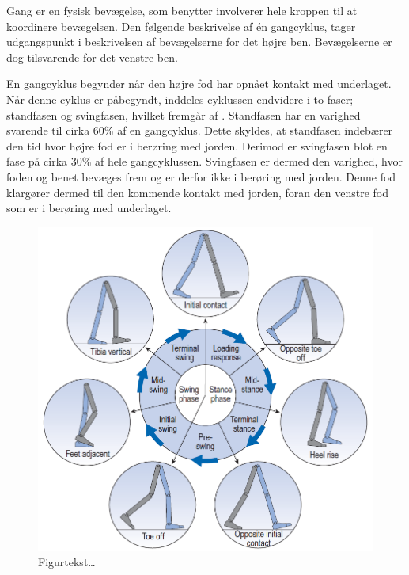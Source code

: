 Gang er en fysisk bevægelse, som benytter involverer hele kroppen til at koordinere bevægelsen. Den følgende beskrivelse af én gangcyklus, tager udgangspunkt i beskrivelsen af bevægelserne for det højre ben. Bevægelserne er dog tilsvarende for det venstre ben. \citep{VaughanDavisOConnor1992,Whittle1990}

En gangcyklus begynder når den højre fod har opnået kontakt med underlaget. Når denne cyklus er påbegyndt, inddeles cyklussen endvidere i to faser; standfasen og svingfasen, hvilket fremgår af . \newline
Standfasen har en varighed svarende til cirka 60\% af en gangcyklus. Dette skyldes, at standfasen indebærer den tid hvor højre fod er i berøring med jorden. Derimod er svingfasen blot en fase på cirka 30\% af hele gangcyklussen. \citep{VaughanDavisOConnor1992} Svingfasen er dermed den varighed, hvor foden og benet bevæges frem og er derfor ikke i berøring med jorden. Denne fod klargører dermed til den kommende kontakt med jorden, foran den venstre fod som er i berøring med underlaget.

\begin{figure}[H]
	\centering
	\includegraphics[scale=0.5]{figures/bProblemloesning/gang_cyklus2.png}
	\caption{Figurtekst…  \cite{VaughanDavisOConnor1992}}
	\label{fig:gang_cyklus}
\end{figure}


